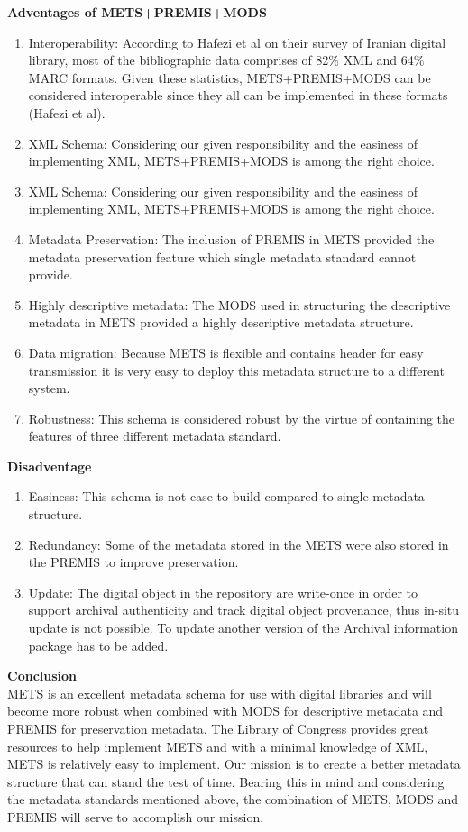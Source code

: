 \begin{enumerate}
	
	{\bf Adventages of METS+PREMIS+MODS}
	\begin{enumerate}
		\item Interoperability: According to Hafezi et al on their survey of Iranian digital library, most of the bibliographic data comprises of 82\% XML and 64\% MARC formats. Given these statistics, METS+PREMIS+MODS can be considered interoperable since they all can be implemented in these formats (Hafezi et al).																					
		\item XML Schema: Considering our given responsibility and the easiness of implementing XML, METS+PREMIS+MODS is among the right choice.
		\item XML Schema: Considering our given responsibility and the easiness of implementing XML, METS+PREMIS+MODS is among the right choice.
		\item Metadata Preservation: The inclusion of PREMIS in METS provided the metadata preservation feature which single metadata standard cannot provide.
		\item Highly descriptive metadata: The MODS used in structuring the descriptive metadata in METS provided a highly descriptive metadata structure.
		\item Data migration: Because METS is flexible and contains header for easy transmission it is very easy to deploy this metadata structure to a different system.
		\item Robustness: This schema is considered robust by the virtue of containing the features of three different metadata standard.
	\end{enumerate}	
	{\bf Disadventage}
	\begin{enumerate}
		\item Easiness: This schema is not ease to build compared to single metadata structure.
		\item Redundancy: Some of the metadata stored in the METS were also stored in the PREMIS to improve preservation.
		\item Update: The digital object in the repository are write-once in order to support archival authenticity and track digital object provenance, thus in-situ update is not possible. To update another version of the Archival information package has to be added.
	\end{enumerate}
	{\bf Conclusion}\\
	METS is an excellent metadata schema for use with digital libraries and will become more robust when combined with MODS for descriptive metadata and PREMIS for preservation metadata. The Library of Congress provides great resources to help implement METS and with a minimal knowledge of XML, METS is relatively easy to implement.
	Our mission is to create a better metadata structure that can stand the test of time. Bearing this in mind and considering the metadata standards mentioned above, the combination of METS, MODS and PREMIS will serve to accomplish our mission.
	

\end{enumerate}
